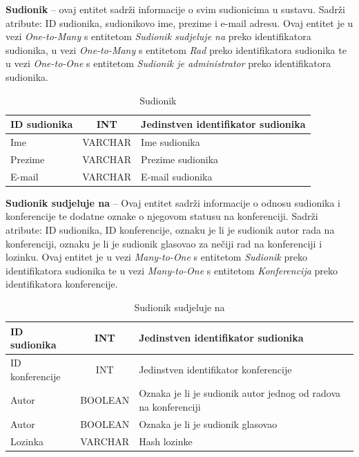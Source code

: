 \textbf{Sudionik} – ovaj entitet sadrži informacije o svim sudionicima u sustavu. Sadrži atribute: ID sudionika, sudionikovo ime, prezime i e-mail adresu. Ovaj entitet je u vezi \textit{One-to-Many} s entitetom \textit{Sudionik sudjeluje na} preko identifikatora sudionika, u vezi \textit{One-to-Many} s entitetom \textit{Rad} preko identifikatora sudionika te u vezi \textit{One-to-One} s entitetom \textit{Sudionik je administrator} preko identifikatora sudionika.

\begin{table}[H]
	\caption{Sudionik}
	\label{tbl:sudionik}
	\centering
	\begin{tabular}{|l|c|l|} 
		\hline
		\cellcolor{lightgreen}ID sudionika & INT & Jedinstven identifikator sudionika\\ 
		\hline
		Ime & VARCHAR & Ime sudionika\\ 
		\hline
		Prezime & VARCHAR & Prezime sudionika\\ 
		\hline
		E-mail & VARCHAR & E-mail sudionika\\ 
		\hline
	\end{tabular}
\end{table}

\textbf{Sudionik sudjeluje na} – Ovaj entitet sadrži informacije o odnosu sudionika i konferencije te dodatne oznake o njegovom statusu na konferenciji. Sadrži atribute: ID sudionika, ID konferencije, oznaku je li je sudionik autor rada na konferenciji, oznaku je li je sudionik glasovao za nečiji rad na konferenciji i lozinku. Ovaj entitet je u vezi \textit{Many-to-One} s entitetom \textit{Sudionik} preko identifikatora sudionika te u vezi \textit{Many-to-One} s entitetom \textit{Konferencija} preko identifikatora konferencije.

\begin{table}[H]
	\caption{Sudionik sudjeluje na}
	\label{tbl:sudionikSudjelujeNa}
	\centering
	\begin{tabular}{|l|c|l|} 
		\hline
		\cellcolor{lightblue}ID sudionika & INT & Jedinstven identifikator sudionika\\ 
		\hline
		\cellcolor{lightblue}ID konferencije & INT & Jedinstven identifikator konferencije\\ 
		\hline
		Autor & BOOLEAN & Oznaka je li je sudionik autor jednog od radova na konferenciji\\ 
		\hline
		Autor & BOOLEAN & Oznaka je li je sudionik glasovao\\ 
		\hline
		Lozinka & VARCHAR & Hash lozinke\\ 
		\hline
	\end{tabular}
\end{table}

